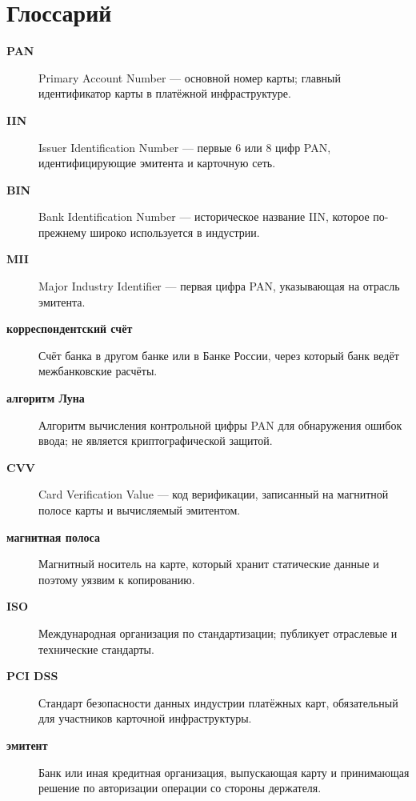 
\chapter{Глоссарий}

\begin{description}
  \item[\textbf{PAN}] Primary Account Number — основной номер карты; главный идентификатор карты в платёжной инфраструктуре.

  \item[\textbf{IIN}] Issuer Identification Number — первые 6 или 8 цифр PAN, идентифицирующие эмитента и карточную сеть.

  \item[\textbf{BIN}] Bank Identification Number — историческое название IIN, которое по-прежнему широко используется в индустрии.

  \item[\textbf{MII}] Major Industry Identifier — первая цифра PAN, указывающая на отрасль эмитента.

  \item[\textbf{корреспондентский счёт}] Счёт банка в другом банке или в Банке России, через который банк ведёт межбанковские расчёты.

  \item[\textbf{алгоритм Луна}] Алгоритм вычисления контрольной цифры PAN для обнаружения ошибок ввода; не является криптографической защитой.

  \item[\textbf{CVV}] Card Verification Value — код верификации, записанный на магнитной полосе карты и вычисляемый эмитентом.

  \item[\textbf{магнитная полоса}] Магнитный носитель на карте, который хранит статические данные и поэтому уязвим к копированию.

  \item[\textbf{ISO}] Международная организация по стандартизации; публикует отраслевые и технические стандарты.

  \item[\textbf{PCI DSS}] Стандарт безопасности данных индустрии платёжных карт, обязательный для участников карточной инфраструктуры.

  \item[\textbf{эмитент}] Банк или иная кредитная организация, выпускающая карту и принимающая решение по авторизации операции со стороны держателя.


\end{description}
